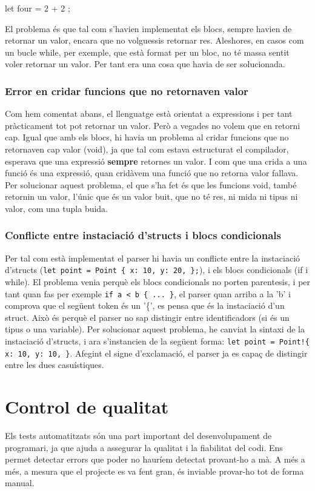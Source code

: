 ﻿\documentclass{article}
\begin{document}
\begin{code}
    let four = { 2 + 2 };
\end{code}

El problema és que tal com s'havien implementat els blocs, sempre havien de
retornar un valor, encara que no volguessis retornar res. Aleshores, en casos
com un bucle while, per exemple, que està format per un bloc, no té massa sentit
voler retornar un valor. Per tant era una cosa que havia de ser solucionada.

\subsubsection{Error en cridar funcions que no retornaven valor}

Com hem comentat abans, el llenguatge està orientat a expressions i per tant
pràcticament tot pot retornar un valor. Però a vegades no volem que en retorni
cap. Igual que amb els blocs, hi havia un problema al cridar funcions que no
retornaven cap valor (void), ja que tal com estava estructurat el compilador,
esperava que una expressió \textbf{sempre} retornes un valor. I com que una
crida a una funció és una expressió, quan cridàvem una funció que no retorna
valor fallava. Per solucionar aquest problema, el que s'ha fet és que les
funcions void, també retornin un valor, l'únic que és un valor buit, que no té
res, ni mida ni tipus ni valor, com una tupla buida.

\subsubsection{Conflicte entre instaciació d'structs i blocs condicionals}
Per tal com està implementat el parser hi havia un conflicte entre la 
instaciació d'structs (\texttt{let point = Point \{ x: 10, y: 20, \};}), i els
blocs condicionals (if i while). El problema venia perquè els blocs condicionals
no porten parentesis, i per tant quan fas per exemple \texttt{if a < b \{ ... \}},
el parser quan arriba a la 'b' i comprova que el següent token és un '\{', es 
pensa que és la instaciació d'un struct. Això és perquè el parser no sap 
distingir entre identificadors (si és un tipus o una variable). Per solucionar
aquest problema, he canviat la sintaxi de la instaciació d'structs, i ara 
s'instancien de la següent forma: \texttt{let point = Point!\{ x: 10, y: 10, \}}.
Afegint el signe d'exclamació, el parser ja es capaç de distingir entre les dues
casuístiques.

\section{Control de qualitat}
Els tests automatitzats són una part important del desenvolupament de
programari, ja que ajuda a assegurar la qualitat i la fiabilitat del codi. Ens
permet detectar errors que poder no hauríem detectat provant-ho a mà. A més a
més, a mesura que el projecte es va fent gran, és inviable provar-ho tot de
forma manual.
\end{document}
